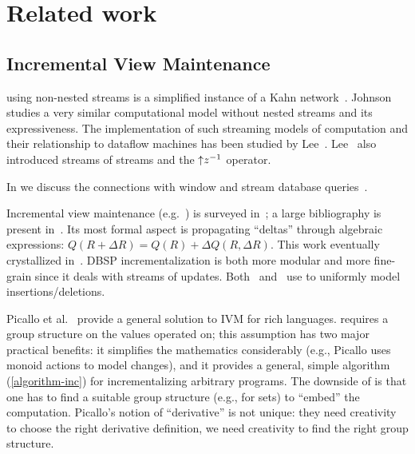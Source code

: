 \section{Related work}\label{sec:related}

\subsection{Incremental View Maintenance}

\dbsp using non-nested streams is a simplified instance of a Kahn 
network~\cite{kahn-ifip74}.  Johnson~\cite{johnson-phd83}
studies a very similar computational model without nested streams and its 
expressiveness. The implementation of such streaming models of computation and their
relationship to dataflow machines has been studied by Lee~\cite{lee-ieee95}.
Lee~\cite{lee-ifip93} also introduced streams of streams and the ${\uparrow}z^{-1}$ operator.

In  we discuss the connections with window and stream database 
queries~\cite{arasu-tr02,aurora}.

Incremental view maintenance (e.g.~\cite{gupta-idb93}) is
surveyed in~\cite{gupta-idb95}; a large bibliography is present in~\cite{motik-ai19}. 
Its most formal aspect is propagating ``deltas'' through algebraic expressions:
$Q(R+\Delta R)=Q(R)+\Delta Q(R,\Delta R)$. This work eventually crystallized in~\cite{koch-pods16}. DBSP 
incrementalization is both more modular and more fine-grain since it deals with streams of updates. 
Both~\cite{koch-pods10} and~\cite{green-tcs11} use \zrs to uniformly model insertions/deletions.

Picallo et al.~\cite{picallo-scop19} provide a general solution to IVM for
rich languages.  \dbsp requires a group structure on the values operated on; 
this assumption has two major practical benefits: it simplifies the mathematics considerably
(e.g., Picallo uses monoid actions to model changes), and it provides a general, simple
algorithm (\ref{algorithm-inc}) for incrementalizing arbitrary programs.  The downside of 
\dbsp is that one has to find a suitable group structure (e.g., \zrs for sets) to ``embed'' 
the computation.  Picallo's notion of ``derivative'' is not unique: they need creativity to choose
the right derivative definition, we need creativity to find the right group structure.

\begin{comment}
The main problem that change structures address is that the types used in programs are not
closed under subtraction (e.g., the delta between two sets is not a set). 
Although a relational \dbsp circuit computes
only on positive \zr values, its incremental version may compute on negative 
values, but the equivalence of the two programs guarantees correctness even though the
type system of \zrs does not.  \val{Safe to delete this para}
\end{comment}

